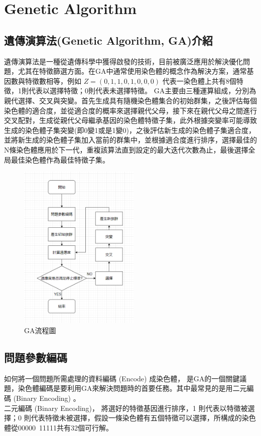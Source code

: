 \chapter{Genetic Algorithm}
\label{chapter:intro}
\section{遺傳演算法(Genetic Algorithm, GA)介紹}
遺傳演算法是一種從遺傳科學中獲得啟發的技術，目前被廣泛應用於解決優化問題，尤其在特徵篩選方面。在GA中通常使用染色體的概念作為解決方案，通常基因數與特徵數相等，例如 \(Z=(0,1,1,0,1,0,0,0)\) 代表一染色體上共有8個特徵，1則代表以選擇特徵；0則代表未選擇特徵。
GA主要由三種運算組成，分別為親代選擇、交叉與突變。首先生成具有隨機染色體集合的初始群集，之後評估每個染色體的適合度，並從適合度的概率來選擇親代父母，接下來在親代父母之間進行交叉配對，生成從親代父母繼承基因的染色體特徵子集，此外根據突變率可能導致生成的染色體子集突變(即0變1或是1變0)，之後評估新生成的染色體子集適合度，並將新生成的染色體子集加入當前的群集中，並根據適合度進行排序，選擇最佳的N條染色體應用於下一代，重複該算法直到設定的最大迭代次數為止，最後選擇全局最佳染色體作為最佳特徵子集。
\begin{figure}[H]
	\centerline{\includegraphics[height=8cm]{pic/GAprocessrevise .png}}
	\caption{GA流程圖}
	\label{fig:GAFlowChart}
\end{figure}

\label{sec:background}
\section{問題參數編碼}
如何將一個問題所需處理的資料編碼 (Encode) 成染色體，
是GA的一個關鍵議題，染色體編碼是要利用GA來解決問題時的首要任務。其中最常見的是用二元編碼 (Binary Encoding) 。\\
二元編碼 (Binary Encoding)，
將選好的特徵基因進行排序，1 則代表以特徵被選擇；0 則代表特徵未被選擇，假設一條染色體有五個特徵可以選擇，所構成的染色體從00000~11111共有32個可行解。

